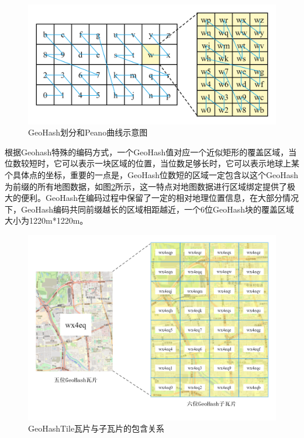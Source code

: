 \begin{figure}[h]
  \centering
  \includegraphics[width=1.0\textwidth]{figures/peano}
  \caption{GeoHash划分和Peano曲线示意图}\label{fig:peano}
\end{figure}


根据Geohash特殊的编码方式，一个GeoHash值对应一个近似矩形的覆盖区域，当位数较短时，它可以表示一块区域的位置，当位数足够长时，它可以表示地球上某个具体点的坐标，重要的一点是，GeoHash位数短的区域一定包含以这个GeoHash为前缀的所有地图数据，如图\ref{fig:fatherAndSon}所示，这一特点对地图数据进行区域绑定提供了极大的便利。GeoHash在编码过程中保留了一定的相对地理位置信息，在大部分情况下，GeoHash编码共同前缀越长的区域相距越近，一个6位GeoHash块的覆盖区域大小为1220m*1220m。

\begin{figure}[h]
  \centering
  \includegraphics[width=1.0\textwidth]{figures/瓦片与子瓦片}
  \caption{GeoHashTile瓦片与子瓦片的包含关系}\label{fig:fatherAndSon}
\end{figure}

